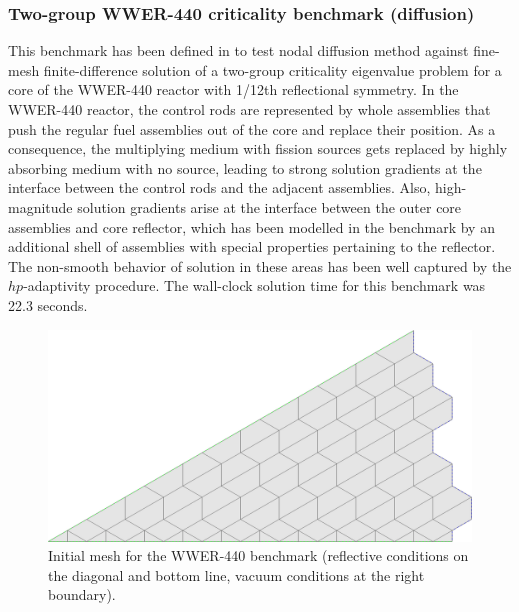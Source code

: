 \subsubsection{Two-group WWER-440 criticality benchmark (diffusion)}
This benchmark has been defined in \cite{Chao2} to test nodal diffusion method against fine-mesh finite-difference
solution of a two-group criticality eigenvalue problem for a core of the WWER-440 reactor with 1/12th reflectional
symmetry.
In the WWER-440 reactor, the control rods are represented by whole assemblies that push the regular fuel
assemblies out of the core and replace their position. As a consequence, the multiplying medium with fission
sources gets replaced by highly absorbing medium with no source, leading to strong solution gradients at the interface
between the control rods and the adjacent assemblies. Also, high-magnitude solution gradients arise at the interface
between the outer core assemblies and core reflector, which has been modelled in the benchmark by an additional shell of
assemblies with special properties pertaining to the reflector. The non-smooth behavior of solution in these areas has
been well captured by the $hp$-adaptivity procedure. The wall-clock solution time for this benchmark was 22.3 seconds.

\begin{figure}[!hbt]
\centering
  \includegraphics[scale=.2]{vver440/start_mesh}
  \caption{Initial mesh for the WWER-440 benchmark (reflective conditions on the diagonal and bottom line, vacuum
  conditions at the right boundary).}
  \label{fig:60}
\end{figure}

